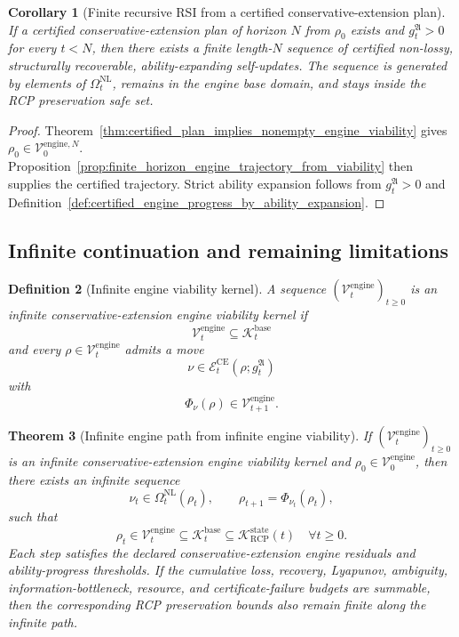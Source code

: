 \documentclass[11pt]{article}
\newtheorem{theorem}{Theorem}[section]
\newtheorem{corollary}[theorem]{Corollary}
\newtheorem{definition}[theorem]{Definition}
\newcommand{\K}{\mathcal{K}}
\newcommand{\Ecal}{\mathcal{E}}
\newcommand{\1}{\mathbf{1}}
\newcommand{\RCP}{\mathrm{RCP}}
\newcommand{\state}{\mathrm{state}}
\providecommand{\Kcal}{\mathcal{K}}
\providecommand{\Vcal}{\mathcal{V}}
\begin{document}
\begin{corollary}[Finite recursive RSI from a certified conservative-extension plan]
\label{cor:finite_recursive_rsi_from_certified_plan}
If a certified conservative-extension plan of horizon \(N\) from \(\rho_0\) exists and \(g_t^{\mathfrak A}>0\) for every \(t<N\), then there exists a finite length-\(N\) sequence of certified non-lossy, structurally recoverable, ability-expanding self-updates.  The sequence is generated by elements of \(\Omega_t^{\mathrm{NL}}\), remains in the engine base domain, and stays inside the RCP preservation safe set.
\end{corollary}

\begin{proof}
Theorem~\ref{thm:certified_plan_implies_nonempty_engine_viability} gives \(\rho_0\in\Vcal_0^{\mathrm{engine},N}\).  Proposition~\ref{prop:finite_horizon_engine_trajectory_from_viability} then supplies the certified trajectory.  Strict ability expansion follows from \(g_t^{\mathfrak A}>0\) and Definition~\ref{def:certified_engine_progress_by_ability_expansion}.
\end{proof}

\subsection{Infinite continuation and remaining limitations}

\begin{definition}[Infinite engine viability kernel]
\label{def:infinite_engine_viability_kernel}
A sequence \((\Vcal_t^{\mathrm{engine}})_{t\ge0}\) is an infinite conservative-extension engine viability kernel if
\[
\Vcal_t^{\mathrm{engine}}
\subseteq\Kcal_t^{\mathrm{base}}
\]
and every \(\rho\in\Vcal_t^{\mathrm{engine}}\) admits a move
\[
\nu\in\Ecal_t^{\mathrm{CE}}(\rho;g_t^{\mathfrak A})
\]
with
\[
\Phi_\nu(\rho)
\in
\Vcal_{t+1}^{\mathrm{engine}}.
\]
\end{definition}

\begin{theorem}[Infinite engine path from infinite engine viability]
\label{thm:infinite_engine_path_from_engine_viability}
If \((\Vcal_t^{\mathrm{engine}})_{t\ge0}\) is an infinite conservative-extension engine viability kernel and \(\rho_0\in\Vcal_0^{\mathrm{engine}}\), then there exists an infinite sequence
\[
\nu_t\in\Omega_t^{\mathrm{NL}}(\rho_t),
\qquad
\rho_{t+1}=\Phi_{\nu_t}(\rho_t),
\]
such that
\[
\rho_t\in\Vcal_t^{\mathrm{engine}}
\subseteq\Kcal_t^{\mathrm{base}}
\subseteq\K_{\RCP}^{\state}(t)
\quad\forall t\ge0.
\]
Each step satisfies the declared conservative-extension engine residuals and ability-progress thresholds.  If the cumulative loss, recovery, Lyapunov, ambiguity, information-bottleneck, resource, and certificate-failure budgets are summable, then the corresponding RCP preservation bounds also remain finite along the infinite path.
\end{theorem}
\end{document}
